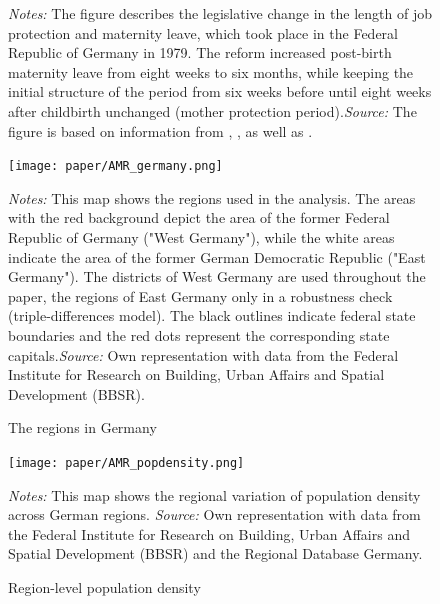 \documentclass[11pt, a4paper,draft]{article} %
\begin{document}
\begin{figure}[H]
	\begin{minipage}{0.9\linewidth}
		\emph{Notes:} The figure describes the legislative change in the length of job protection and maternity leave, which took place in the Federal Republic of Germany in 1979. The reform increased post-birth maternity leave from eight weeks to six months, while keeping the initial structure of the period from six weeks before until eight weeks after childbirth unchanged (mother protection period).\newline \textit{Source: }The figure is based on information from \cite{Dustmann2012}, \cite{DIW2002}, \cite{schonberg2014expansions} as well as \cite{zmarzlik1999mutterschutzgesetz}.
	\end{minipage}
\end{figure}
\begin{figure}[H]\centering
	\caption{The regions in Germany}\label{fig: AMR_regions_Germany}
	\texttt{[image: paper/AMR\_germany.png]}
	\scriptsize
	\begin{minipage}{0.9 \linewidth}
		\emph{Notes:} This map shows the regions used in the analysis. The areas with the red background depict the area of the former Federal Republic of Germany ("West Germany"), while the white areas indicate the area of the former German Democratic Republic ("East Germany"). The districts of West Germany are used throughout the paper, the regions of East Germany only in a robustness check (triple-differences model). The black outlines indicate federal state boundaries and the red dots represent the corresponding state capitals.\newline \emph{Source:} Own representation with data from the Federal Institute for Research on Building, Urban Affairs and Spatial Development (BBSR).
	\end{minipage}
\end{figure}
\newpage
\begin{figure}[H]\centering
	\caption{Region-level population density}\label{fig: AMR_regions_population_density}
	\texttt{[image: paper/AMR\_popdensity.png]}
	\scriptsize
	\begin{minipage}{0.9\linewidth}
		\emph{Notes:} This map shows the regional variation of population density across German regions. \emph{Source:} Own representation with data from the Federal Institute for Research on Building, Urban Affairs and Spatial Development (BBSR) and the Regional Database Germany.
	\end{minipage}
\end{figure}
\end{document}
